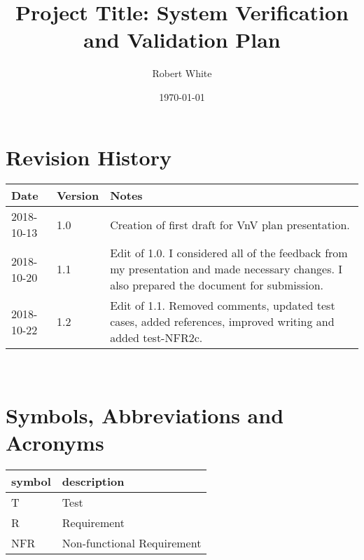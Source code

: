 \documentclass[12pt, titlepage]{article}
\begin{document}
\title{Project Title: System Verification and Validation Plan} 
\author{Robert White}
\date{\today}
	
\maketitle


\section{Revision History}

\begin{tabularx}{\textwidth}{p{3cm}p{2cm}X}
\toprule {\bf Date} & {\bf Version} & {\bf Notes}\\
\midrule
2018-10-13 & 1.0 & Creation of first draft for VnV plan presentation.\\
2018-10-20 & 1.1 & Edit of 1.0. I considered all of the feedback from my 
presentation and made necessary changes. I also prepared the document for 
submission. \\ 
2018-10-22 & 1.2 & Edit of 1.1. Removed comments, updated test cases, added 
references, improved writing and added test-NFR2c. \\ 
\bottomrule
\end{tabularx}

~\newpage

\section{Symbols, Abbreviations and Acronyms}

\renewcommand{\arraystretch}{1.2}
\begin{tabular}{l l} 
  \toprule		
  \textbf{symbol} & \textbf{description}\\
  \midrule 
  T & Test\\
  R & Requirement\\ 
  NFR & Non-functional Requirement\\ 
  \bottomrule
\end{tabular}\\

\newpage

\tableofcontents

\listoftables

\listoffigures

\newpage

\end{document}
